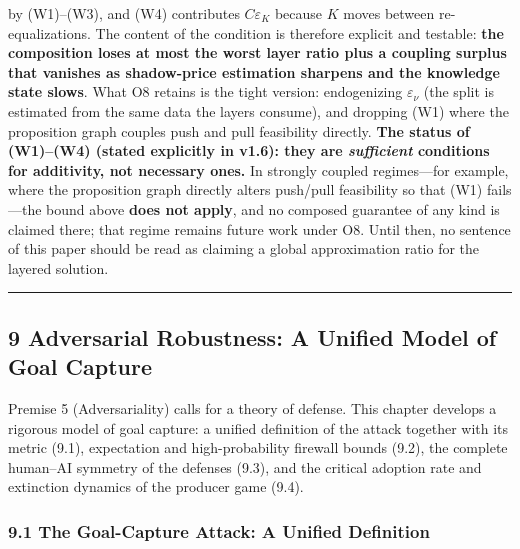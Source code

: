 \documentclass[
  11pt]{article}
\begin{document}
by (W1)--(W3), and (W4) contributes \(C\varepsilon_K\) because \(K\)
moves between re-equalizations. The content of the condition is
therefore explicit and testable: \textbf{the composition loses at most
the worst layer ratio plus a coupling surplus that vanishes as
shadow-price estimation sharpens and the knowledge state slows}. What O8
retains is the tight version: endogenizing \(\varepsilon_\nu\) (the
split is estimated from the same data the layers consume), and dropping
(W1) where the proposition graph couples push and pull feasibility
directly. \textbf{The status of (W1)--(W4) (stated explicitly in v1.6):
they are \emph{sufficient} conditions for additivity, not necessary
ones.} In strongly coupled regimes---for example, where the proposition
graph directly alters push/pull feasibility so that (W1) fails---the
bound above \textbf{does not apply}, and no composed guarantee of any
kind is claimed there; that regime remains future work under O8. Until
then, no sentence of this paper should be read as claiming a global
approximation ratio for the layered solution.

\begin{center}\rule{0.5\linewidth}{0.5pt}\end{center}

\subsection{9 Adversarial Robustness: A Unified Model of Goal
Capture}\label{adversarial-robustness-a-unified-model-of-goal-capture}

Premise 5 (Adversariality) calls for a theory of defense. This chapter
develops a rigorous model of goal capture: a unified definition of the
attack together with its metric (9.1), expectation and high-probability
firewall bounds (9.2), the complete human--AI symmetry of the defenses
(9.3), and the critical adoption rate and extinction dynamics of the
producer game (9.4).

\subsubsection{9.1 The Goal-Capture Attack: A Unified
Definition}\label{the-goal-capture-attack-a-unified-definition}
\end{document}

